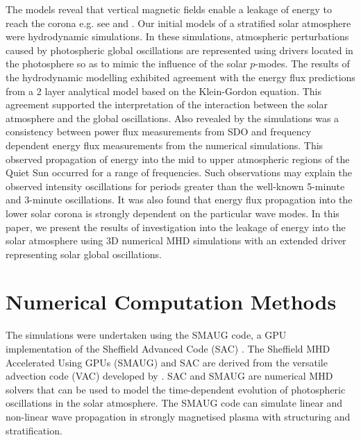 \documentclass[physics,article,submit,pdftex,moreauthors]{Definitions/mdpi}
\begin{document}
The models reveal that vertical magnetic fields enable a leakage of energy to reach the corona e.g. see  \cite{Khomenko2013} and  \cite{Santamaria2015}. Our initial models of a stratified solar atmosphere \cite{Griffiths2018b} were hydrodynamic simulations. In these simulations, atmospheric perturbations caused by photospheric global oscillations are represented using drivers located in the photosphere so as to mimic the influence of the solar $p$-modes. The results of the hydrodynamic modelling exhibited agreement  with the energy flux predictions from a 2 layer  analytical model based on the Klein-Gordon equation. This agreement supported the interpretation of the interaction between the solar atmosphere and the global oscillations. Also revealed by the simulations  was a consistency between power flux measurements from SDO and frequency dependent energy flux measurements from the numerical simulations. This observed propagation of energy into the mid to upper atmospheric regions of the Quiet Sun occurred for a range of frequencies. Such observations may explain the observed intensity oscillations for periods greater than the well-known 5-minute and 3-minute oscillations. It was also found that energy flux propagation into the lower solar corona is strongly dependent on the particular wave modes. In this paper, we present the results of investigation into the leakage of energy into the solar atmosphere using 3D numerical MHD simulations with an extended driver representing solar global oscillations. 







\section{Numerical Computation Methods}


The simulations were undertaken using the SMAUG code, a GPU implementation of the Sheffield Advanced Code (SAC) \cite{Shelyag2008}. The Sheffield MHD Accelerated Using GPUs (SMAUG) \cite{Griffiths2015} and SAC  are derived from the versatile advection code (VAC) developed by \cite{Toth1996}. SAC and SMAUG are numerical MHD solvers  that can be used to model the time-dependent evolution of photospheric oscillations in the solar atmosphere. The SMAUG code can simulate linear and non-linear wave propagation in strongly magnetised plasma with structuring and stratification.
\end{document}
